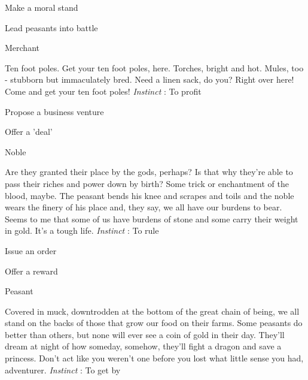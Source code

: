 \startitemize[1,packed]
         
\item Make a moral stand

         
\item Lead peasants into battle

       
\stopitemize
       
\startMonsterName
Merchant	
\stopMonsterName
       
\startMonsterDescription
Ten foot poles. Get your ten foot poles, here. Torches, bright and hot. Mules, too - stubborn but immaculately bred. Need a linen sack, do you? Right over here! Come and get your ten foot poles! {\em Instinct} : To profit
\stopMonsterDescription
       
\startitemize[1,packed]
         
\item Propose a business venture

         
\item Offer a 'deal'

       
\stopitemize
       
\startMonsterName
Noble	
\stopMonsterName
       
\startMonsterDescription
Are they granted their place by the gods, perhaps? Is that why they’re able to pass their riches and power down by birth? Some trick or enchantment of the blood, maybe. The peasant bends his knee and scrapes and toils and the noble wears the finery of his place and, they say, we all have our burdens to bear. Seems to me that some of us have burdens of stone and some carry their weight in gold. It’s a tough life. {\em Instinct} : To rule
\stopMonsterDescription
       
\startitemize[1,packed]
         
\item Issue an order

         
\item Offer a reward

       
\stopitemize
       
\startMonsterName
Peasant	
\stopMonsterName
       
\startMonsterDescription
Covered in muck, downtrodden at the bottom of the great chain of being, we all stand on the backs of those that grow our food on their farms. Some peasants do better than others, but none will ever see a coin of gold in their day. They’ll dream at night of how someday, somehow, they’ll fight a dragon and save a princess. Don’t act like you weren’t one before you lost what little sense you had, adventurer. {\em Instinct} : To get by
\stopMonsterDescription
       
